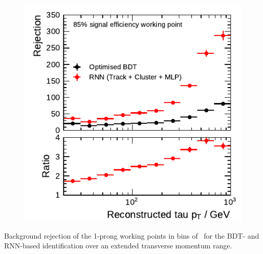 \begin{minipage}{\textwidth}
\begin{subfigure}[t]{0.48\textwidth}
  \end{subfigure}
  \begin{subfigure}[t]{0.48\textwidth}
    \centering
    \includegraphics{./figures/rnn/combined/highpt/rnn_loose_1p.pdf}
  \end{subfigure}
  \caption[Background rejection of the 1-prong working points in bins of
  \tauhadvis~\pt for the RNN-based identification (extended \tauhadvis~\pt
  range)]{Background rejection of the 1-prong working points in bins of
    \tauhadvis~\pt for the BDT- and RNN-based identification over an extended
    transverse momentum range.}
\end{minipage}

\clearpage

